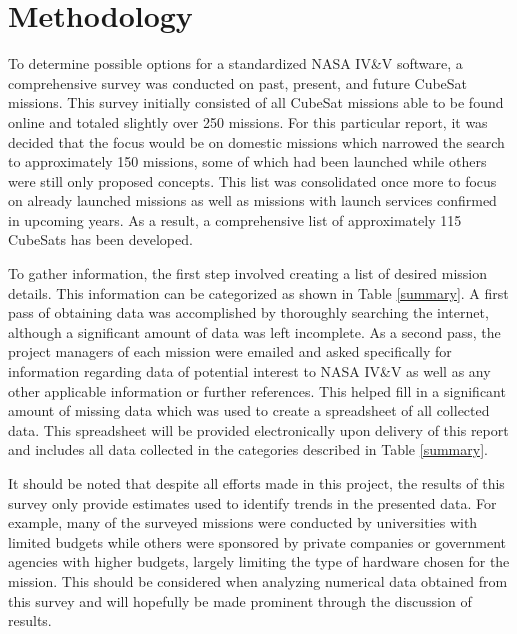 \documentclass[11pt]{article}
\begin{document}
\section{Methodology}
To determine possible options for a standardized NASA IV\&V software, a comprehensive survey was conducted on past, present, and future CubeSat missions.  This survey initially consisted of all CubeSat missions able to be found online and totaled slightly over 250 missions.  For this particular report, it was decided that the focus would be on domestic missions which narrowed the search to approximately 150 missions, some of which had been launched while others were still only proposed concepts.  This list was consolidated once more to focus on already launched missions as well as missions with launch services confirmed in upcoming years.  
As a result, a comprehensive list of approximately 115 CubeSats has been developed.  

To gather information, the first step involved creating a list of desired mission details.  This information can be categorized as shown in Table \ref{summary}.  A first pass of obtaining data was accomplished by thoroughly searching the internet, although a significant amount of data was left incomplete.  As a second pass, the project managers of each mission were emailed and asked specifically for information regarding data of potential interest to NASA IV\&V as well as any other applicable information or further references.  This helped fill in a significant amount of missing data which was used to create a spreadsheet of all collected data.  This spreadsheet will be provided electronically upon delivery of this report and includes all data collected in the categories described in Table \ref{summary}.

It should be noted that despite all efforts made in this project, the results of this survey only provide estimates used to identify trends in the presented data.  For example, many of the surveyed missions were conducted by universities with limited budgets while others were sponsored by private companies or government agencies with higher budgets, largely limiting the type of hardware chosen for the mission.  This should be considered when analyzing numerical data obtained from this survey and will hopefully be made prominent through the discussion of results. 
\end{document}
